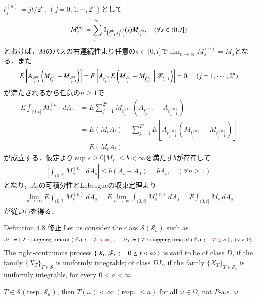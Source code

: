 	\begin{prf}
		$t_j^{(n)} \coloneqq jt/2^n,\ (j=0,1,\cdots,2^n)$として
		\begin{align}
			M^{(n)}_s \coloneqq \sum_{j=1}^{2^n} \mbox{1}\hspace{-0.25em}\mbox{l}_{\left(t^{(n)}_{j-1},t^{(n)}_j\right]}(s) M_{t^{(n)}_j},
			\quad (\forall s \in (0,t])
		\end{align}
		とおけば，$M$のパスの右連続性より任意の$s \in (0,t]$で$\lim_{n \to \infty} M^{(n)}_s = M_s$となる．また
		\begin{align}
			E \left[ A_{t^{(n)}_{j-1}} \left( M_{t^{(n)}_j} - M_{t^{(n)}_{j-1}} \right) \right]
			= E \left[ A_{t^{(n)}_{j-1}} E\left( M_{t^{(n)}_j} - M_{t^{(n)}_{j-1}} \, \middle|\, \mathscr{F}_{t_{j-1}} \right) \right]
			= 0,
			\quad (j=1,\cdots,2^n)
		\end{align}
		が満たされるから任意の$n \geq 1$で
		\begin{align}
			E\int_{(0,t]} M^{(n)}_s\ dA_s
			&= E \sum_{j=1}^{2^n} M_{t^{(n)}_j} \left( A_{t^{(n)}_j} - A_{t^{(n)}_{j-1}} \right) \\
			&= E(M_t A_t) - \sum_{j=1}^{2^n} E \left[ A_{t^{(n)}_{j-1}} \left( M_{t^{(n)}_j} - M_{t^{(n)}_{j-1}} \right) \right] \\
			&= E(M_t A_t)
		\end{align}
		が成立する．仮定より$\sup{s \geq 0}{|M_s|} \leq b < \infty$を満たす$b$が存在して
		\begin{align}
			\left| \int_{(0,t]} M^{(n)}_s\ dA_s \right| \leq b (A_t - A_0) = b A_t,
			\quad (\forall n \geq 1)
		\end{align}
		となり，$A_t$の可積分性とLebesgueの収束定理より
		\begin{align}
			\lim_{n \to \infty} E \int_{(0,t]} M^{(n)}_s\ dA_s = E \lim_{n \to \infty} \int_{(0,t]} M^{(n)}_s\ dA_s
			= E \int_{(0,t]} M_s\ dA_s 
		\end{align}
		が従い()を得る．
		\QED
	\end{prf}
	
	\begin{itembox}[l]{Definition 4.8 修正}
		Let us consider the class $\mathscr{S}(\mathscr{S}_a)$ such as
		\begin{align}
			\mathscr{S} \coloneqq \left\{\ T:\mbox{stopping time of $(\mathscr{F}_t)$}\ \, ; \quad \textcolor{red}{T < \infty}\ \right\},
			\quad \mathscr{S}_a \coloneqq \left\{\ T:\mbox{stopping time of $(\mathscr{F}_t)$}\ \, ; \quad \textcolor{red}{T \leq a}\ \right\},\ (a > 0).
		\end{align}
		The right-continuous process $\left\{\ X_t,\mathscr{F}_t\ \, ; \quad 0 \leq t < \infty\ \right\}$ is said to be 
		of class $D$, if the family $\{X_T\}_{T \in \mathscr{S}}$ is uniformly integrable;
		of class $DL$, if the family $\{X_T\}_{T \in \mathscr{S}_a}$ is uniformly integrable,
		for every $0 < a < \infty$.
	\end{itembox}
	$T \in \mathscr{S}(\mbox{resp. } \mathscr{S}_a)$, then 
	$T(\omega) < \infty\ (\mbox{resp. } \leq a)$
	for all $\omega \in \Omega$, not $P$-a.s. $\omega$.
	
